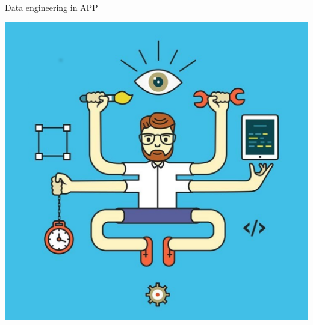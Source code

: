 \begin{frame}{Data engineering in APP}
\begin{minipage}[c]{0.47\textwidth}
  \includegraphics[width=1\textwidth]{pics/DE_fun.pdf}
\end{minipage}
\end{frame}


